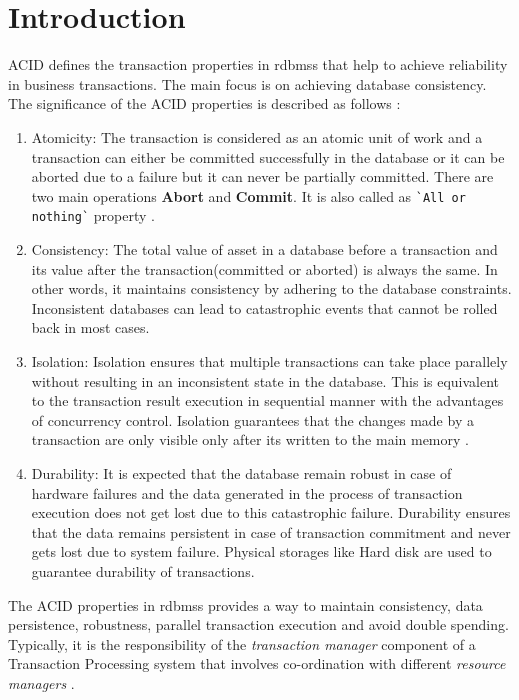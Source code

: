 \documentclass[
  a4paper,  %
  twoside,  %
  bibliography=totoc,
  headsepline,
  cleardoublepage=empty,
  parskip=half,
  draft=false
]{scrbook}
\begin{document}
%
%


\chapter{Introduction}

ACID defines the transaction properties in \glspl{rdbms} that help to achieve reliability in business transactions. The main focus is on achieving database consistency. The significance of the ACID properties is described as follows :
\begin{enumerate}
  \item Atomicity: The transaction is considered as an atomic unit of work and a transaction can either be committed successfully in the database or it can be aborted due to a failure but it can never be partially committed. There are two main operations \textbf{Abort} and \textbf{Commit}. It is also called as \verb|`All or nothing`| property \cite{Atomicity}.
  \item Consistency: The total value of asset in a database before a transaction and its value after the transaction(committed or aborted) is always the same. In other words, it maintains consistency by adhering to the database constraints. Inconsistent databases can lead to catastrophic events that cannot be rolled back in most cases.
  \item Isolation: Isolation ensures that multiple transactions can take place parallely without resulting in an inconsistent state in the database. This is equivalent to the transaction result execution in sequential manner with the advantages of concurrency control. Isolation guarantees that the changes made by a transaction are only visible only after its written to the main memory \cite{Atomicity}.
  \item Durability: It is expected that the database remain robust in case of hardware failures and the data generated in the process of transaction execution does not get lost due to this catastrophic failure. Durability ensures that the data remains persistent in case of transaction commitment and never gets lost due to system failure. Physical storages like Hard disk are used to guarantee durability of transactions.
\end{enumerate}

The ACID properties in \glspl{rdbms} provides a way to maintain consistency, data persistence, robustness, parallel transaction execution and avoid double spending. Typically, it is the responsibility of the \textit{transaction manager} component of a Transaction Processing system that involves co-ordination with different \textit{resource managers} \cite{Salt}. 
\end{document}
